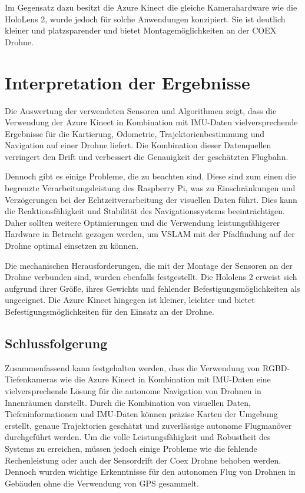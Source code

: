 Im Gegensatz dazu besitzt die Azure Kinect die gleiche Kamerahardware wie die HoloLens 2, wurde jedoch für solche Anwendungen konzipiert. Sie ist deutlich kleiner und platzsparender und bietet Montagemöglichkeiten an der COEX Drohne. 

\section{Interpretation der Ergebnisse}

Die Auswertung der verwendeten Sensoren und Algorithmen zeigt, dass die Verwendung der Azure Kinect in Kombination mit \ac{IMU}-Daten vielversprechende Ergebnisse für die Kartierung, Odometrie, Trajektorienbestimmung und Navigation auf einer Drohne liefert. Die Kombination dieser Datenquellen verringert den Drift und verbessert die Genauigkeit der geschätzten Flugbahn.

Dennoch gibt es einige Probleme, die zu beachten sind. Diese sind zum einen die begrenzte Verarbeitungsleistung des Raspberry Pi, was zu Einschränkungen und Verzögerungen bei der Echtzeitverarbeitung der visuellen Daten führt. Dies kann die Reaktionsfähigkeit und Stabilität des Navigationssystems beeinträchtigen. Daher sollten weitere Optimierungen und die Verwendung leistungsfähigerer Hardware in Betracht gezogen werden, um \ac{VSLAM} mit der Pfadfindung auf der Drohne optimal einsetzen zu können.

Die mechanischen Herausforderungen, die mit der Montage der Sensoren an der Drohne verbunden sind, wurden ebenfalls festgestellt. Die Hololens 2 erweist sich aufgrund ihrer Größe, ihres Gewichts und fehlender Befestigungsmöglichkeiten als ungeeignet. Die Azure Kinect hingegen ist kleiner, leichter und bietet Befestigungsmöglichkeiten für den Einsatz an der Drohne.

\subsection{Schlussfolgerung}
Zusammenfassend kann festgehalten werden, dass die Verwendung von RGBD-Tiefenkameras wie die Azure Kinect in Kombination mit \ac{IMU}-Daten eine vielversprechende Lösung für die autonome Navigation von Drohnen in Innenräumen darstellt. Durch die Kombination von visuellen Daten, Tiefeninformationen und \ac{IMU}-Daten können präzise Karten der Umgebung erstellt, genaue Trajektorien geschätzt und zuverlässige autonome Flugmanöver durchgeführt werden. Um die volle Leistungsfähigkeit und Robustheit des Systems zu erreichen, müssen jedoch einige Probleme wie die fehlende Rechenleistung oder auch der Sensordrift der Coex Drohne behoben werden. \\
Dennoch wurden wichtige Erkenntnisse für den autonomen Flug von Drohnen in Gebäuden ohne die Verwendung von \ac{GPS} gesammelt.




